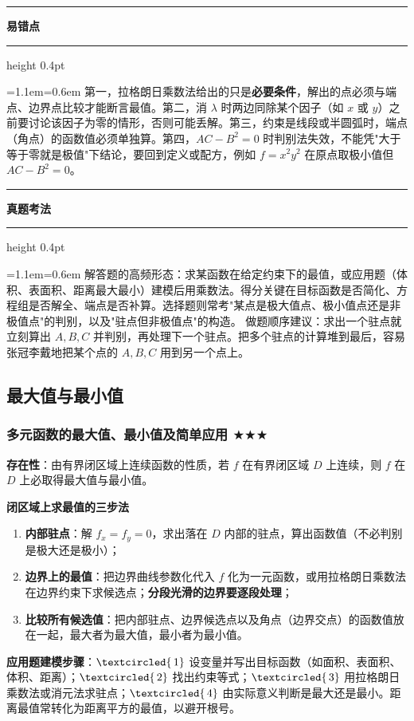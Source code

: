 \documentclass[11pt,openany,UTF8]{ctexbook}
\newcommand{\circled}[1]{\textcircled{\scriptsize\,#1}}
\newcommand{\callouthead}[2]{%
  \par\addvspace{7pt}\noindent
  {\color{#1}\rule[-0.15em]{3pt}{1.05em}}\hspace{0.5em}%
  {\bfseries\color{#1}#2}\par\nobreak\vspace{-0.35em}%
  {\color{rulesep}\hrule height 0.4pt}\nobreak\vspace{0.45em}%
  \begingroup\small\setlength{\parindent}{0pt}%
  \leftskip=1.1em\rightskip=0.6em\noindent\ignorespaces}
\newcommand{\calloutend}{\par\endgroup\addvspace{7pt}}
\newenvironment{callwarn}[1]{\callouthead{warnbar}{#1}}{\calloutend}
\newenvironment{callexam}[1]{\callouthead{exambar}{#1}}{\calloutend}
\begin{document}
\begin{callwarn}{易错点}
第一，拉格朗日乘数法给出的只是\textbf{必要条件}，解出的点必须与端点、边界点比较才能断言最值。第二，消 $\lambda$ 时两边同除某个因子（如 $x$ 或 $y$）之前要讨论该因子为零的情形，否则可能丢解。第三，约束是线段或半圆弧时，端点（角点）的函数值必须单独算。第四，$AC-B^{2}=0$ 时判别法失效，不能凭"大于等于零就是极值"下结论，要回到定义或配方，例如 $f=x^{2}y^{2}$ 在原点取极小值但 $AC-B^{2}=0$。

\end{callwarn}

\begin{callexam}{真题考法}
解答题的高频形态：求某函数在给定约束下的最值，或应用题（体积、表面积、距离最大最小）建模后用乘数法。得分关键在目标函数是否简化、方程组是否解全、端点是否补算。选择题则常考"某点是极大值点、极小值点还是非极值点"的判别，以及"驻点但非极值点"的构造。 做题顺序建议：求出一个驻点就立刻算出 $A,B,C$ 并判别，再处理下一个驻点。把多个驻点的计算堆到最后，容易张冠李戴地把某个点的 $A,B,C$ 用到另一个点上。

\end{callexam}

\subsection{最大值与最小值}

\subsubsection{多元函数的最大值、最小值及简单应用 $\bigstar$$\bigstar$$\bigstar$}

\textbf{存在性}：由有界闭区域上连续函数的性质，若 $f$ 在有界闭区域 $D$ 上连续，则 $f$ 在 $D$ 上必取得最大值与最小值。

\textbf{闭区域上求最值的三步法}

\begin{enumerate}
\item \textbf{内部驻点}：解 $f_x=f_y=0$，求出落在 $D$ 内部的驻点，算出函数值（不必判别是极大还是极小）；
\item \textbf{边界上的最值}：把边界曲线参数化代入 $f$ 化为一元函数，或用拉格朗日乘数法在边界约束下求候选点；\textbf{分段光滑的边界要逐段处理}；
\item \textbf{比较所有候选值}：把内部驻点、边界候选点以及角点（边界交点）的函数值放在一起，最大者为最大值，最小者为最小值。
\end{enumerate}
\textbf{应用题建模步骤}：$\circled{1}$ 设变量并写出目标函数（如面积、表面积、体积、距离）；$\circled{2}$ 找出约束等式；$\circled{3}$ 用拉格朗日乘数法或消元法求驻点；$\circled{4}$ 由实际意义判断是最大还是最小。距离最值常转化为距离平方的最值，以避开根号。
\end{document}
